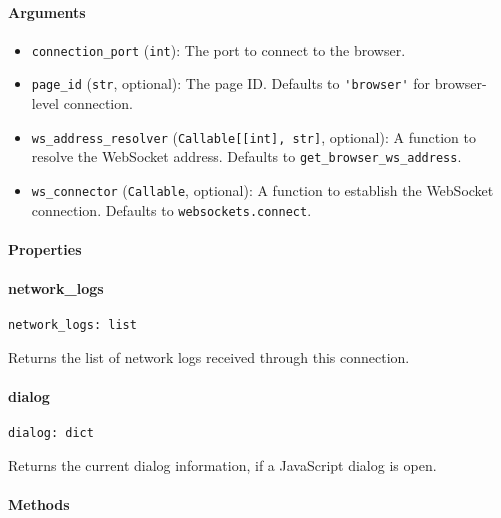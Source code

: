 \documentclass{article}
\begin{document}
\paragraph{Arguments}

\begin{itemize}
    \item \lstinline[style=pythonstyle]|connection_port| (\lstinline[style=pythonstyle]|int|): The port to connect to the browser.
    \item \lstinline[style=pythonstyle]|page_id| (\lstinline[style=pythonstyle]|str|, optional): The page ID\@. Defaults to \lstinline[style=pythonstyle]|'browser'| for browser-level connection.
    \item \lstinline[style=pythonstyle]|ws_address_resolver| (\lstinline[style=pythonstyle]|Callable[[int], str]|, optional): A function to resolve the WebSocket address. Defaults to \lstinline[style=pythonstyle]|get_browser_ws_address|.
    \item \lstinline[style=pythonstyle]|ws_connector| (\lstinline[style=pythonstyle]|Callable|, optional): A function to establish the WebSocket connection. Defaults to \lstinline[style=pythonstyle]|websockets.connect|.
\end{itemize}

\paragraph{Properties}
\paragraph{network\_logs}

\begin{lstlisting}[style=pythonstyle]
network_logs: list
\end{lstlisting}

\noindent Returns the list of network logs received through this connection.

\paragraph{dialog}

\begin{lstlisting}[style=pythonstyle]
dialog: dict
\end{lstlisting}

\noindent Returns the current dialog information, if a JavaScript dialog is open.

\paragraph{Methods}
\end{document}
